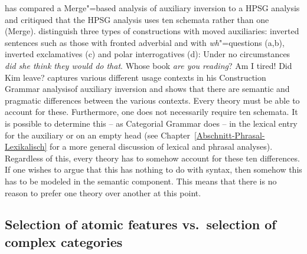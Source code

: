 \citet{Chomsky2010a} has compared a Merge"=based analysis of auxiliary inversion to a HPSG analysis and critiqued that the HPSG analysis uses ten schemata rather than
one (Merge). \citet{GSag2000a-u} distinguish three types of constructions with moved auxiliaries:
inverted sentences such as those with fronted adverbial and with \emph{wh}"=questions (a,b), inverted
exclamatives (c) and polar interrogatives (d):
\eal
\ex Under no circumstances \emph{did she think they would do that}.
\ex Whose book \emph{are you reading}?
\ex Am I tired!
\ex Did Kim leave?
\zl
\addlines
\citet{Fillmore99a} captures various different usage contexts in his Construction Grammar analysis\indexcxg of
auxiliary inversion and shows that there are semantic and pragmatic differences between the various contexts. Every
theory must be able to account for these. Furthermore, one does not necessarily require ten schemata. It is possible
to determine this -- as Categorial Grammar does -- in the lexical entry for the auxiliary or on an empty head (see
Chapter~\ref{Abschnitt-Phrasal-Lexikalisch} for a more general discussion of lexical and phrasal analyses). Regardless of
this, every theory has to somehow account for these ten differences. If one wishes to argue that this has nothing to
do with syntax, then somehow this has to be modeled in the semantic component. This means that there is no reason
to prefer one theory over another at this point.%


\subsection{Selection of atomic features vs.\ selection of complex categories}
\label{sec-selection-features-vs-categories}


